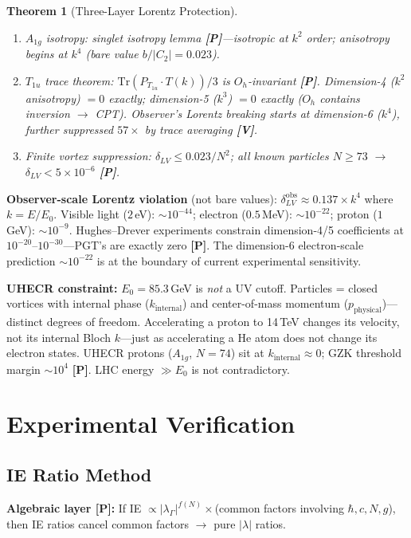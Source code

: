 \documentclass[11pt,a4paper]{article}
\newtheorem{theorem}{Theorem}[section]
\newcommand{\gradeP}{\textbf{[P]}}
\newcommand{\gradeV}{\textbf{[V]}}
\begin{document}
\begin{theorem}[Three-Layer Lorentz Protection]
\begin{enumerate}[nosep]
\item $A_{1g}$ isotropy: singlet isotropy lemma \gradeP---isotropic at $k^2$ order; anisotropy begins at $k^4$ (bare value $b/|C_2| = 0.023$).
\item $T_{1u}$ trace theorem: $\mathrm{Tr}(P_{T_{1u}}\cdot T(k))/3$ is $O_h$-invariant \gradeP. Dimension-4 ($k^2$ anisotropy) $= 0$ exactly; dimension-5 ($k^3$) $= 0$ exactly ($O_h$ contains inversion $\to$ CPT). Observer's Lorentz breaking starts at dimension-6 ($k^4$), further suppressed $57\times$ by trace averaging \gradeV.
\item Finite vortex suppression: $\delta_{LV} \leq 0.023/N^2$; all known particles $N\geq 73$ $\to$ $\delta_{LV} < 5\times 10^{-6}$ \gradeP.
\end{enumerate}
\end{theorem}

\textbf{Observer-scale Lorentz violation} (not bare values): $\delta_{LV}^{\mathrm{obs}} \approx 0.137\times k^4$ where $k = E/E_0$. Visible light ($2$\,eV): $\sim 10^{-44}$; electron ($0.5$\,MeV): $\sim 10^{-22}$; proton ($1$\,GeV): $\sim 10^{-9}$. Hughes--Drever experiments constrain dimension-4/5 coefficients at $10^{-20}$--$10^{-30}$---PGT's are exactly zero \gradeP. The dimension-6 electron-scale prediction $\sim 10^{-22}$ is at the boundary of current experimental sensitivity.

\textbf{UHECR constraint:} $E_0 = 85.3$\,GeV is \emph{not} a UV cutoff. Particles = closed vortices with internal phase ($k_{\mathrm{internal}}$) and center-of-mass momentum ($p_{\mathrm{physical}}$)---distinct degrees of freedom. Accelerating a proton to 14\,TeV changes its velocity, not its internal Bloch $k$---just as accelerating a He atom does not change its electron states. UHECR protons ($A_{1g}$, $N{=}74$) sit at $k_{\mathrm{internal}}\approx 0$; GZK threshold margin $\sim 10^4$ \gradeP. LHC energy $\gg E_0$ is not contradictory.

\section{Experimental Verification}\label{sec:verification}

\subsection{IE Ratio Method}
\textbf{Algebraic layer \gradeP:} If IE $\propto |\lambda_\Gamma|^{f(N)}\times$(common factors involving $\hbar, c, N, g$), then IE ratios cancel common factors $\to$ pure $|\lambda|$ ratios.
\end{document}
